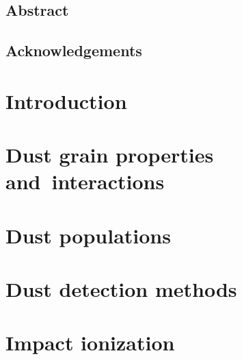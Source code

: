 \documentclass[11pt,twoside,openright]{book}
\begin{document}
\frontmatter


\newpage\null\thispagestyle{empty}\newpage

\setcounter{page}{1}\thispagestyle{empty}\newpage

\section*{Abstract}


\newpage\null\newpage
\section*{Acknowledgements}

\newpage\null\newpage

\tableofcontents

\mainmatter

\chapter{Introduction}


\chapter{Dust grain properties\\and~interactions}\label{ch:forces}


\chapter{Dust populations}


\chapter{Dust detection methods}


\chapter{Impact ionization}

\end{document}
